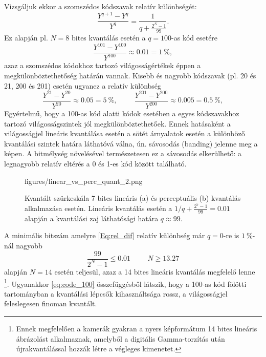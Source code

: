 Vizsgáljuk ekkor a szomszédos kódszavak relatív különbségét:
\begin{equation}
\frac{Y^{q+1}-Y^q}{Y^q} = \frac{1 }{q + \frac{2^N - 1}{99}}.
\label{Eq:rel_dif}
\end{equation}
Ez alapján pl. $N = 8$  bites kvantálás esetén a $q = 100$-as kód esetére
\begin{equation*}
\frac{Y^{101}-Y^{100}}{Y^{100}} \approx 0.01 = 1~\%,
\end{equation*}
azaz a szomszédos kódokhoz tartozó világosságértékek éppen a megkülönböztethetőség határán vannak.
Kisebb és nagyobb kódszavak (pl. 20 és 21, 200 és 201) esetén ugyanez a relatív különbség
\begin{equation*}
\frac{Y^{21}-Y^{20}}{Y^{20}} \approx 0.05 = 5~\%, \hspace{1cm} \frac{Y^{201}-Y^{200}}{Y^{200}} \approx 0.005 = 0.5~\%,
\label{eq:code_100}
\end{equation*}
Egyértelmű, hogy a 100-as kód alatti kódok esetében a egyes kódszavakhoz tartozó világosságszintek jól megkülönböztethetőek.
Ennek hatásaként a világosságjel lineáris kvantálása esetén a sötét árnyalatok esetén a különböző kvantálási szintek határa láthatóvá válna, ún. sávosodás (banding) jelenne meg a képen.
A bitmélység növelésével természetesen ez a sávosodás elkerülhető:
a legnagyobb relatív eltérés a 0 és 1-es kód között található. 
%
\begin{figure}[]
	\centering
	\begin{overpic}[width = 0.8\columnwidth ]{figures/linear_vs_perc_quant_2.png}
	\end{overpic}
	\caption{Kvantált szürkeskála 7 bites lineáris (a) és perceptuális (b) kvantálás alkalmazása esetén.
	Lineáris kvantálás esetén a $1 / q + \frac{2^7 - 1}{99} = 0.01$ alapján a kvantálási zaj láthatósági határa $q \approx 99$.}
	\label{Fig:linear_vs_perc_quant_2}
\end{figure}
%
A minimális bitszám amelyre \eqref{Eq:rel_dif} relatív különbség már $q=0$-re is $1~\%$-nál nagyobb
\begin{equation}
\frac{99}{2^N - 1} \leq 0.01 \hspace{1cm} N \geq 13.27 
\end{equation}
alapján $N=14$ esetén teljesül, azaz a 14 bites lineáris kvantálás megfelelő lenne \footnote{Ennek megfelelően a kamerák gyakran a nyers képformátum 14 bites lineáris ábrázolást alkalmaznak, amelyből a digitális Gamma-torzítás után újrakvantálással hozzák létre a végleges kimenetet.}.
Ugyanakkor \eqref{eq:code_100} összefüggésből látszik, hogy a 100-as kód fölötti tartományban a kvantálási lépcsők kihasználtsága rossz, a világosságjel feleslegesen finoman kvantált.

